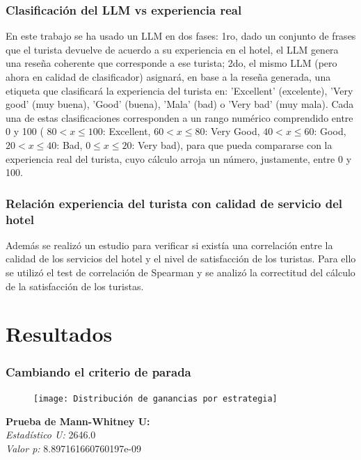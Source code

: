 \documentclass[12pt,a4paper]{article} \usepackage[spanish]{babel} \usepackage{graphicx} \usepackage{amsmath} \usepackage{amsfonts} \usepackage{amssymb} \usepackage{float} \usepackage{geometry}
\begin{document}
\subsubsection{Clasificación del LLM vs experiencia real}
En este trabajo se ha usado un LLM en dos fases: 1ro, dado un conjunto de frases que el turista devuelve de acuerdo a su experiencia en el hotel, el LLM genera una reseña coherente que corresponde a ese turista; 2do, el mismo LLM (pero ahora en calidad de clasificador) asignará, en base a la reseña generada, una etiqueta que clasificará la experiencia del turista en: 'Excellent' (excelente), 'Very good' (muy buena), 'Good' (buena), 'Mala' (bad) o 'Very bad' (muy mala). Cada una de estas clasificaciones corresponden a un rango numérico comprendido entre 0 y 100 ( $80 < x \le 100$: Excellent, $60 < x \le 80$: Very Good, $40 < x \le 60$: Good, $20 < x \le 40$: Bad, $0 \le x \le 20$: Very bad), para que pueda compararse con la experiencia real del turista, cuyo cálculo arroja un número, justamente, entre 0 y 100.
\subsubsection{Relación experiencia del turista con calidad de servicio del hotel}
Además se realizó un estudio para verificar si existía una correlación entre la calidad de los servicios del hotel y el nivel de satisfacción de los turistas. Para ello se utilizó el test de correlación de Spearman y se analizó la correctitud del cálculo de la satisfacción de los turistas.


\section{Resultados}


\subsubsection{Cambiando el criterio de parada}

\begin{figure}[H] \centering \texttt{[image: Distribución de ganancias por estrategia]} \caption{} \label{fig:etiqueta} \end{figure}
\textbf{Prueba de Mann-Whitney U:}\\
\textit{Estadístico U:} 2646.0\\
\textit{Valor p:} 8.897161660760197e-09\\
\end{document}
